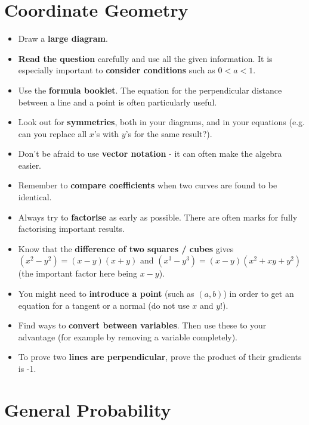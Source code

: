 \documentclass[9pt]{extarticle}
\begin{document}
	\section{Coordinate Geometry}
	
	\begin{itemize}
		\item Draw a \textbf{large diagram}.
		\item \textbf{Read the question} carefully and use all the given information. It is especially important to \textbf{consider conditions} such as $0<a<1$.
		\item Use the \textbf{formula booklet}. The equation for the perpendicular distance between a line and a point is often particularly useful.
		\item Look out for \textbf{symmetries}, both in your diagrams, and in your equations (e.g. can you replace all $x$'s with $y$'s for the same result?).
		\item Don't be afraid to use \textbf{vector notation} - it can often make the algebra easier.
		\item Remember to \textbf{compare coefficients} when two curves are found to be identical.
		\item Always try to \textbf{factorise} as early as possible. There are often marks for fully factorising important results.
		\item Know that the \textbf{difference of two squares / cubes} gives $(x^2-y^2) = (x-y)(x+y)$ and $(x^3 - y^3) = (x-y)(x^2 + xy + y^2)$ (the important factor here being $x-y$).
		\item You might need to \textbf{introduce a point} (such as $(a,b)$) in order to get an equation for a tangent or a normal (do not use $x$ and $y$!).
		\item Find ways to \textbf{convert between variables}. Then use these to your advantage (for example by removing a variable completely).
		\item To prove two \textbf{lines are perpendicular}, prove the product of their gradients is -1.
	\end{itemize}
	
	\section{General Probability}
	
\end{document}
